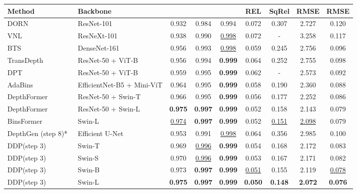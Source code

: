 \documentclass[10pt,twocolumn,letterpaper]{article}
\newcommand{\ours}[0]{DDP\xspace}
\begin{document}
\begin{table*}[ht]
\centering
\footnotesize
\renewcommand\arraystretch{1.05}
\setlength{\tabcolsep}{2.2mm}
\begin{tabular}{l|l|ccc|cccc}
Method & Backbone &  &  &  & REL  & SqRel  & RMSE  & RMSE  \\
\hline
DORN~\cite{fu2018deep}  & ResNet-101 & 0.932 & 0.984 & 0.994 & 0.072 & 0.307 & 2.727 & 0.120 \\
VNL~\cite{yin2019enforcing} & ResNeXt-101 & 0.938 & 0.990 & \underline{0.998} & 0.072 & - & 3.258 & 0.117 \\
BTS~\cite{lee2019big}  & DenseNet-161 & 0.956 & 0.993 & \underline{0.998} & 0.059 & 0.245 & 2.756 & 0.096 \\
TransDepth~\cite{yang2021transformer}  & ResNet-50 + ViT-B & 0.956 & 0.994 & \textbf{0.999} & 0.064 & 0.252 & 2.755 & 0.098 \\
DPT~\cite{ranftl2021vision}  & ResNet-50 + ViT-B & 0.959 & 0.995 & \textbf{0.999} & 0.062 & - & 2.573 & 0.092 \\
AdaBins~\cite{bhat2021adabins}  & EfficientNet-B5 + Mini-ViT & 0.964 & 0.995 & \textbf{0.999} & 0.058 & 0.190 & 2.360 & 0.088 \\
DepthFormer~\cite{li2022depthformer} & ResNet-50 + Swin-T & 0.966 & 0.995 & \textbf{0.999} & 0.056 & 0.177 & 2.252 & 0.086 \\
DepthFormer~\cite{li2022depthformer} & ResNet-50 + Swin-L  & \textbf{0.975} & \textbf{0.997} & \textbf{0.999} & 0.052 & 0.158 & 2.143 & 0.079 \\
BinsFormer~\cite{li2022binsformer} & Swin-L  & \underline{0.974} & \textbf{0.997} & \textbf{0.999} & 0.052 & \underline{0.151} & \underline{2.098} & 0.079 \\
\hline
DepthGen (step 8)*~\cite{saxena2023depthgen} &  Efficient U-Net & 0.953 & 0.991 & \underline{0.998} & 0.064 & 0.356 & 2.985 & 0.100\\
\rowcolor{gray!10} 
\ours (step 3) & Swin-T &0.969 & \underline{0.996} & \textbf{0.999} & 0.054 & 0.168&2.172&0.083 \\ 
\rowcolor{gray!10} 
\ours (step 3) & Swin-S &0.970 & \underline{0.996} & \textbf{0.999} & 0.053 & 0.167 &2.171 & 0.082 \\
\rowcolor{gray!10} 
\ours (step 3) & Swin-B & 0.973 & \textbf{0.997} & \textbf{0.999} & \underline{0.051} & 0.155 & 2.119 & \underline{0.078} \\
\rowcolor{gray!20} 
\ours (step 3) & Swin-L & \textbf{0.975} & \textbf{0.997} & \textbf{0.999} & \textbf{0.050} & \textbf{0.148} & \textbf{2.072} & \textbf{0.076} \\
\end{tabular}
\vspace{1em}
\caption{\textbf{Depth estimation on the KITTI val set.}
Backbones pre-trained on ImageNet-22K are marked with .
We report the performance of \ours with 3 diffusion steps.
The best and second-best results are bolded or underlined, respectively. ↓ means lower is better, and ↑ means higher is better. * denotes best results of our concurrent work~\cite{saxena2023depthgen}.}
\vspace{-1em}
\label{tab:exp:depth:kitti}
\end{table*}
\end{document}
